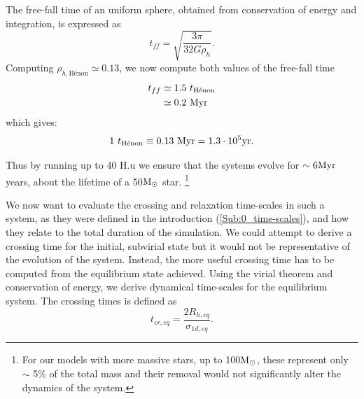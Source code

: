  The free-fall time of an uniform sphere, obtained from conservation of energy and integration, is expressed as
\begin{equation}
t_{ff} = \sqrt{\frac{3\pi}{32 G \rho_{h	}}}.
\end{equation}
Computing $\rho_{h,\textrm{H\'enon}} \simeq 0.13$, we now compute both values of the free-fall time
\begin{align}
t_{ff} &\simeq 1.5~ t_{\textrm{H\'enon}}\\
	   &\simeq 0.2~ {\textrm{Myr}}
\end{align}
which gives: 
\begin{equation}
1 ~ t_{\textrm{H\'enon}} \equiv 0.13~ {\textrm{Myr}} = 1.3 \cdot 10^5 {\textrm{yr}} .
\end{equation}


Thus by running up to 40 H.u we ensure that the systems evolve for $ \sim  6 {\textrm{Myr}} $ years, about the lifetime of a 50${\textrm{M}_\odot}$ star. \footnote{For our models with more massive stars, up to 100${\textrm{M}_\odot}$, these represent only $\sim$ 5\% of the total mass and their removal would not significantly alter the dynamics of the system.}

We now want to evaluate the crossing and relaxation time-scales in such a system, as they were defined in the introduction (\ref{Sub:0_time-scales}), and how they relate to the total duration of the simulation. We could attempt to derive a crossing time for the initial, subvirial state but it would not be representative of the evolution of the system. Instead, the more useful crossing time has to be computed from the equilibrium state achieved. Using the virial theorem and conservation of energy, we derive dynamical time-scales for the equilibrium system. The crossing times is defined as
\begin{equation}
\label{Eq:3_tcr}
t_{cr,eq} = \frac{2 R_{h,eq}}{\sigma_{1d,eq}}.
\end{equation}

